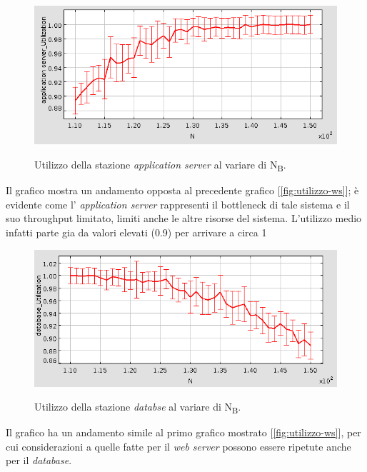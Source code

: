 \documentclass[../main.tex]{subfiles}
\begin{document}
    \begin{figure}[H]
        \centering
        \includegraphics[scale = 0.6]{assets/u_as_174.png}\\
        \caption[\textit{Utilizzo} della stazione \textit{application server}]{Utilizzo della stazione \textit{
            application server} al variare di N\textsubscript{B}.}
        \label{fig:utilizzo-as}
    \end{figure}
    Il grafico mostra un andamento opposta al precedente grafico [\ref{fig:utilizzo-ws}]; è evidente come l'
    \textit{application server} rappresenti il bottleneck di tale sistema e il suo throughput limitato, limiti anche le
    altre risorse del sistema. L'utilizzo medio infatti parte gia da valori elevati (0.9) per arrivare a circa 1
    \begin{figure}[H]
        \centering
        \includegraphics[scale = 0.6]{assets/u_db_174.png}\\
        \caption[\textit{Utilizzo} della stazione \textit{database}]{Utilizzo della stazione \textit{
            databse} al variare di N\textsubscript{B}.}
        \label{fig:utilizzo-db}
    \end{figure}
    Il grafico ha un andamento simile al primo grafico mostrato [\ref{fig:utilizzo-ws}], per cui
    considerazioni a quelle fatte per il \textit{web server} possono essere ripetute anche per il \textit{database}.
\end{document}
